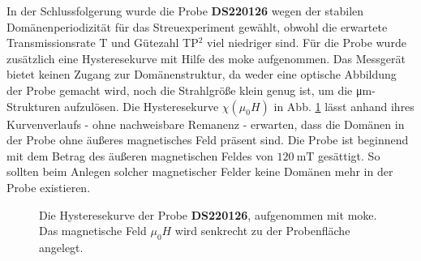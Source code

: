 \noindent
In der Schlussfolgerung wurde die Probe \textbf{DS220126} wegen der stabilen Domänenperiodizität für das Streuexperiment gewählt, obwohl die erwartete Transmissionsrate $\text{T}$ und Gütezahl TP$^2$ viel niedriger sind. Für die Probe wurde zusätzlich eine Hysteresekurve mit Hilfe des \gls{moke} aufgenommen. Das Messgerät bietet keinen Zugang zur Domänenstruktur, da weder eine optische Abbildung der Probe gemacht wird, noch die Strahlgröße klein genug ist, um die \si{\micro\meter}-Strukturen aufzulösen. Die Hysteresekurve $\chi(\mu_0 H)$ in Abb. \ref{fig:hysterese_sample} lässt anhand ihres Kurvenverlaufs - ohne nachweisbare Remanenz - erwarten, dass die Domänen in der Probe ohne äußeres magnetisches Feld präsent sind. Die Probe ist beginnend mit dem Betrag des äußeren magnetischen Feldes von $\SI{120}{\milli\tesla}$ gesättigt. So sollten beim Anlegen solcher magnetischer Felder keine Domänen mehr in der Probe existieren.
\begin{figure}[H]
    \centering
    
    \caption{Die Hysteresekurve der Probe \textbf{DS220126}, aufgenommen mit \gls{moke}. Das magnetische Feld $\mu_0 H$ wird senkrecht zu der Probenfläche angelegt.}
    \label{fig:hysterese_sample}
\end{figure}
\newpage


